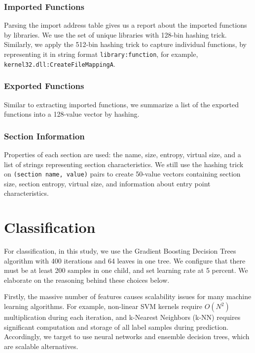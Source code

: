 \subsubsection{Imported Functions}
\label{sssec:imported}

Parsing the import address table gives us a report about the imported functions by libraries. We use the set of unique libraries with 128-bin hashing trick. Similarly, we apply the 512-bin hashing trick to capture individual functions, by representing
it in string format \verb|library:function|, for example, \verb|kernel32.dll:CreateFileMappingA|.

\subsubsection{Exported Functions}

Similar to extracting imported functions, we summarize a list of the exported functions into a 128-value vector by hashing.

\subsubsection{Section Information}

Properties of each section are used: the name, size, entropy, virtual size, and a list of strings representing section characteristics. We still use the hashing trick on \verb|(section name, value)| pairs to create 50-value vectors containing section size, section entropy, virtual size, and information about entry point characteristics.

\section{Classification}
 
For classification, in this study, we use the Gradient Boosting Decision Trees algorithm with 400 iterations and 64 leaves in one tree. We configure that there must be at least 200 samples in one child, and set learning rate at 5 percent. We elaborate on the reasoning behind these choices below.

Firstly, the massive number of features causes scalability issues for many machine learning algorithms.  For example,  non-linear  SVM  kernels require $O(N^2)$ multiplication during each iteration, and k-Nearest Neighbors (k-NN) requires significant computation and storage of all label samples during prediction. Accordingly, we target to use neural networks and ensemble decision trees, which are scalable alternatives.

